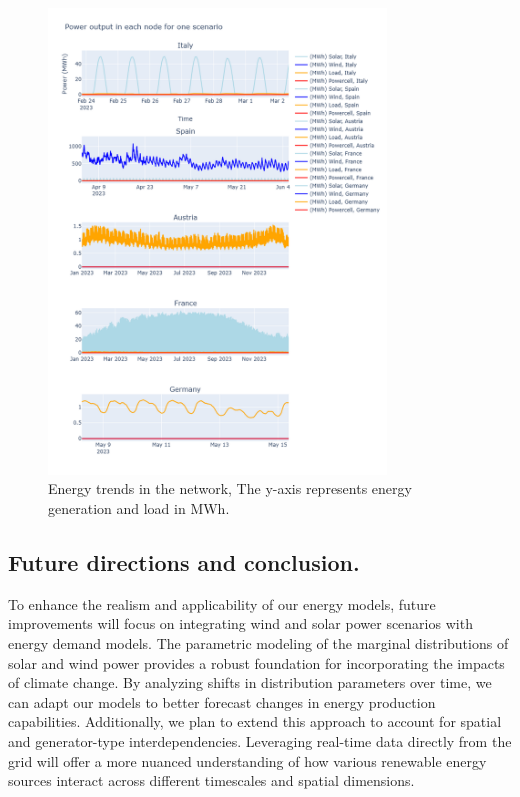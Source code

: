 \documentclass[english]{article}
\numberwithin{definition}{section}
\numberwithin{theorem}{section}
\numberwithin{problem}{section}
\begin{document}
\begin{figure}[H]
  \centering
  \includegraphics[width=0.80\textwidth]{immagini/time_aggregation/Energytrends.png}
  \caption{Energy trends in the network, The y-axis represents energy generation and load in MWh.}
  \label{fig:energytrends}
\end{figure}



\subsection{Future directions and conclusion.}

To enhance the realism and applicability of our energy models, future improvements will focus on integrating wind and solar power scenarios with energy demand models. The parametric modeling of the marginal distributions of solar and wind power provides a robust foundation for incorporating the impacts of climate change. By analyzing shifts in distribution parameters over time, we can adapt our models to better forecast changes in energy production capabilities. Additionally, we plan to extend this approach to account for spatial and generator-type interdependencies. Leveraging real-time data directly from the grid will offer a more nuanced understanding of how various renewable energy sources interact across different timescales and spatial dimensions.
\end{document}
